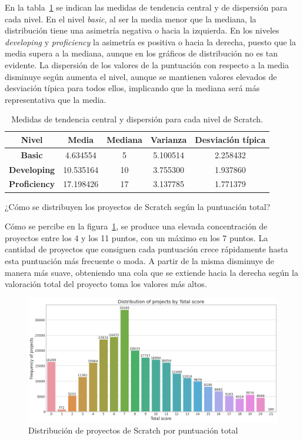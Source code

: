 \documentclass[a4paper, 12pt]{book}
\begin{document}
En la tabla~\ref{table:mean_Scratch} se indican las medidas de tendencia central y de dispersión para cada nivel. En el nivel \emph{basic}, al ser la media menor que la mediana, la distribución tiene una asimetría negativa o hacia la izquierda. En los niveles \emph{developing} y \emph{proficiency} la asimetría es positiva o hacia la derecha, puesto que la media supera a la mediana, aunque en los gráficos de distribución no es tan evidente. La dispersión de los valores de la puntuación con respecto a la media disminuye según aumenta el nivel, aunque se mantienen valores elevados de desviación típica para todos ellos, implicando que la mediana será más representativa que la media.

\begin{table}[htbp]
 \begin{center}
  \begin{tabular}{|c|c|c|c|c|}
    \hline
     \textbf{Nivel} & \textbf{Media} & \textbf{Mediana} & \textbf{Varianza} & \textbf{Desviación típica} \\ \hline
    \textbf{Basic} & 4.634554 & 5 & 5.100514 & 2.258432 \\ \hline
    \textbf{Developing} & 10.535164 & 10 & 3.755300 &  1.937860 \\ \hline
    \textbf{Proficiency} & 17.198426 & 17 & 3.137785 &  1.771379 \\ \hline
  \end{tabular}
  \caption{Medidas de tendencia central y dispersión para cada nivel de Scratch.}
  \label{table:mean_Scratch}
 \end{center}
\end{table}

¿Cómo se distribuyen los proyectos de Scratch según la puntuación total?

Cómo se percibe en la figura~\ref{fig:total_Scratch}, se produce una elevada concentración de proyectos entre los 4 y los 11 puntos, con un máximo en los 7 puntos. La cantidad de proyectos que consiguen cada puntuación crece rápidamente hasta esta puntuación más frecuente o moda. A partir de la misma disminuye de manera más suave, obteniendo una cola que se extiende hacia la derecha según la valoración total del proyecto toma los valores más altos.

\begin{figure}[H]
    \centering
    \includegraphics[width=.9
    \textwidth]{img/frequency_total_score_Scratch.png}
    \caption{Distribución de proyectos de Scratch por puntuación total}\label{fig:total_Scratch}
\end{figure}
\end{document}
